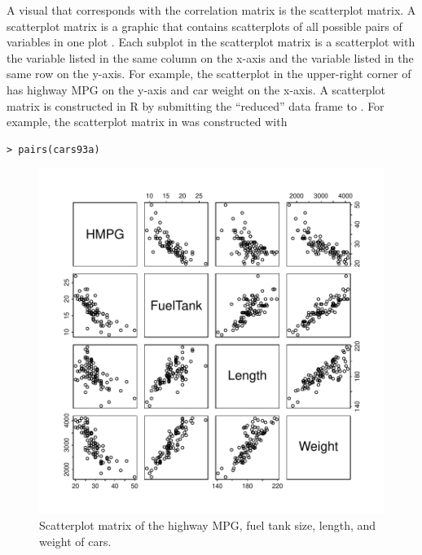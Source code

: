 \documentclass[10pt,openany]{book}\usepackage[]{graphicx}\usepackage[]{color}
\makeatletter
\newenvironment{kframe}{%
 \def\at@end@of@kframe{}%
 \ifinner\ifhmode%
  \def\at@end@of@kframe{\end{minipage}}%
  \begin{minipage}{\columnwidth}%
 \fi\fi%
 \def\FrameCommand##1{\hskip\@totalleftmargin \hskip-\fboxsep
 \colorbox{shadecolor}{##1}\hskip-\fboxsep
     \hskip-\linewidth \hskip-\@totalleftmargin \hskip\columnwidth}%
 \MakeFramed {\advance\hsize-\width
   \@totalleftmargin\z@ \linewidth\hsize
   \@setminipage}}%
 {\par\unskip\endMakeFramed%
 \at@end@of@kframe}
\newenvironment{knitrout}{}{} %
\makeatother
\begin{document}

A visual that corresponds with the correlation matrix is the scatterplot matrix.  A scatterplot matrix is a graphic that contains scatterplots of all possible pairs of variables in one plot .  Each subplot in the scatterplot matrix is a scatterplot with the variable listed in the same column on the x-axis and the variable listed in the same row on the y-axis.  For example, the scatterplot in the upper-right corner of  has highway MPG on the y-axis and car weight on the x-axis.  A scatterplot matrix is constructed in R by submitting the ``reduced'' data frame to .  For example, the scatterplot matrix in  was constructed with
\begin{knitrout}
\color{fgcolor}\begin{kframe}
\begin{verbatim}
> pairs(cars93a)
\end{verbatim}
\end{kframe}\begin{figure}[hbtp]

{\centering \includegraphics[width=.7\linewidth]{Figs/Scatplot4-1} 

}

\caption[Scatterplot matrix of the highway MPG, fuel tank size, length, and weight of cars]{Scatterplot matrix of the highway MPG, fuel tank size, length, and weight of cars.}\label{fig:Scatplot4}
\end{figure}


\end{knitrout}
\end{document}
